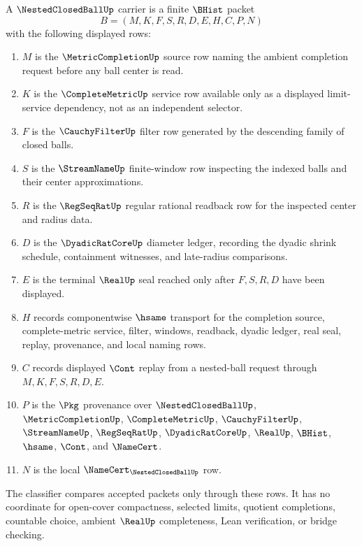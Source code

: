 \begin{definition}
\label{def:nested-closed-ball-carrier}
A $\NestedClosedBallUp$ carrier is a finite $\BHist$ packet
$$
B=(M,K,F,S,R,D,E,H,C,P,N)
$$
with the following displayed rows:
\begin{enumerate}
\item $M$ is the $\MetricCompletionUp$ source row naming the ambient completion request before any ball center is read.
\item $K$ is the $\CompleteMetricUp$ service row available only as a displayed limit-service dependency, not as an independent selector.
\item $F$ is the $\CauchyFilterUp$ filter row generated by the descending family of closed balls.
\item $S$ is the $\StreamNameUp$ finite-window row inspecting the indexed balls and their center approximations.
\item $R$ is the $\RegSeqRatUp$ regular rational readback row for the inspected center and radius data.
\item $D$ is the $\DyadicRatCoreUp$ diameter ledger, recording the dyadic shrink schedule, containment witnesses, and late-radius comparisons.
\item $E$ is the terminal $\RealUp$ seal reached only after $F,S,R,D$ have been displayed.
\item $H$ records componentwise $\hsame$ transport for the completion source, complete-metric service, filter, windows, readback, dyadic ledger, real seal, replay, provenance, and local naming rows.
\item $C$ records displayed $\Cont$ replay from a nested-ball request through $M,K,F,S,R,D,E$.
\item $P$ is the $\Pkg$ provenance over $\NestedClosedBallUp$, $\MetricCompletionUp$, $\CompleteMetricUp$, $\CauchyFilterUp$, $\StreamNameUp$, $\RegSeqRatUp$, $\DyadicRatCoreUp$, $\RealUp$, $\BHist$, $\hsame$, $\Cont$, and $\NameCert$.
\item $N$ is the local $\NameCert_{\NestedClosedBallUp}$ row.
\end{enumerate}
The classifier compares accepted packets only through these rows. It has no coordinate for open-cover compactness, selected limits, quotient completions, countable choice, ambient $\RealUp$ completeness, Lean verification, or bridge checking.
\end{definition}

